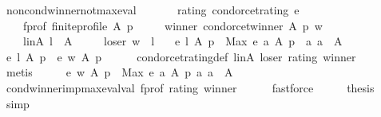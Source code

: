 \begin{isabellebody}
\isamarkupfalse%
%
\endisatagproof
{\isafoldproof}%
%
\isadelimproof
\isanewline
%
\endisadelimproof
\isanewline
\isanewline
{}\isamarkupfalse%
\ non{\isacharunderscore}{\kern0pt}cond{\isacharunderscore}{\kern0pt}winner{\isacharunderscore}{\kern0pt}not{\isacharunderscore}{\kern0pt}max{\isacharunderscore}{\kern0pt}eval{\isacharcolon}{\kern0pt}\isanewline
\ \ \isanewline
\ \ \ \ rating{\isacharcolon}{\kern0pt}\ {\isachardoublequoteopen}condorcet{\isacharunderscore}{\kern0pt}rating\ e{\isachardoublequoteclose}\ \isanewline
\ \ \ \ f{\isacharunderscore}{\kern0pt}prof{\isacharcolon}{\kern0pt}\ {\isachardoublequoteopen}finite{\isacharunderscore}{\kern0pt}profile\ A\ p{\isachardoublequoteclose}\ \isanewline
\ \ \ \ winner{\isacharcolon}{\kern0pt}\ {\isachardoublequoteopen}condorcet{\isacharunderscore}{\kern0pt}winner\ A\ p\ w{\isachardoublequoteclose}\ \isanewline
\ \ \ \ linA{\isacharcolon}{\kern0pt}\ {\isachardoublequoteopen}l\ {\isasymin}\ A{\isachardoublequoteclose}\ \isanewline
\ \ \ \ loser{\isacharcolon}{\kern0pt}\ {\isachardoublequoteopen}w\ {\isasymnoteq}\ l{\isachardoublequoteclose}\isanewline
\ \ \ {\isachardoublequoteopen}e\ l\ A\ p\ {\isacharless}{\kern0pt}\ Max\ {\isacharbraceleft}{\kern0pt}e\ a\ A\ p\ {\isacharbar}{\kern0pt}\ a{\isachardot}{\kern0pt}\ a\ {\isasymin}\ A{\isacharbraceright}{\kern0pt}{\isachardoublequoteclose}\isanewline
%
\isadelimproof
%
\endisadelimproof
%
\isatagproof
{}\isamarkupfalse%
\ {\isacharminus}{\kern0pt}\isanewline
\ \ \isamarkupfalse%
\ {\isachardoublequoteopen}e\ l\ A\ p\ {\isacharless}{\kern0pt}\ e\ w\ A\ p{\isachardoublequoteclose}\isanewline
\ \ \ \ \isamarkupfalse%
\ condorcet{\isacharunderscore}{\kern0pt}rating{\isacharunderscore}{\kern0pt}def\ linA\ loser\ rating\ winner\isanewline
\ \ \ \ \isamarkupfalse%
\ metis\isanewline
\ \ \isamarkupfalse%
\ \isamarkupfalse%
\ {\isachardoublequoteopen}e\ w\ A\ p\ {\isacharequal}{\kern0pt}\ Max\ {\isacharbraceleft}{\kern0pt}e\ a\ A\ p\ {\isacharbar}{\kern0pt}a{\isachardot}{\kern0pt}\ a\ {\isasymin}\ A{\isacharbraceright}{\kern0pt}{\isachardoublequoteclose}\isanewline
\ \ \ \ \isamarkupfalse%
\ cond{\isacharunderscore}{\kern0pt}winner{\isacharunderscore}{\kern0pt}imp{\isacharunderscore}{\kern0pt}max{\isacharunderscore}{\kern0pt}eval{\isacharunderscore}{\kern0pt}val\ f{\isacharunderscore}{\kern0pt}prof\ rating\ winner\isanewline
\ \ \ \ \isamarkupfalse%
\ fastforce\isanewline
\ \ \isamarkupfalse%
\ \isamarkupfalse%
\ {\isacharquery}{\kern0pt}thesis\isanewline
\ \ \ \ \isamarkupfalse%
\ simp\isanewline
{}\isamarkupfalse%
%
\endisatagproof
{\isafoldproof}%
%
\isadelimproof
\isanewline
%
\endisadelimproof
%
\isadelimtheory
\isanewline
%
\endisadelimtheory
%
\isatagtheory
{}\isamarkupfalse%
%
\endisatagtheory
{\isafoldtheory}%
%
\isadelimtheory
%
\endisadelimtheory
%
\end{isabellebody}%
